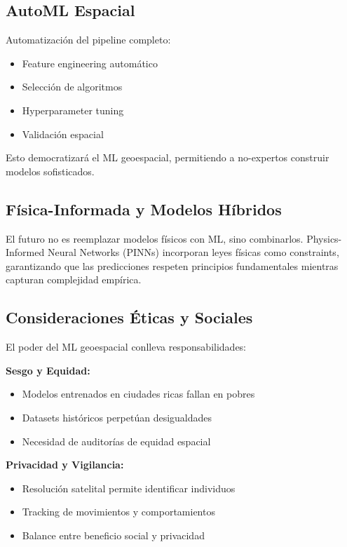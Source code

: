 \documentclass[12pt,a4paper]{article}
\begin{document}
\subsection{AutoML Espacial}

Automatización del pipeline completo:
\begin{itemize}
    \item Feature engineering automático
    \item Selección de algoritmos
    \item Hyperparameter tuning
    \item Validación espacial
\end{itemize}

Esto democratizará el ML geoespacial, permitiendo a no-expertos construir modelos sofisticados.

\subsection{Física-Informada y Modelos Híbridos}

\begin{reflexion}
El futuro no es reemplazar modelos físicos con ML, sino combinarlos. Physics-Informed Neural Networks (PINNs) incorporan leyes físicas como constraints, garantizando que las predicciones respeten principios fundamentales mientras capturan complejidad empírica.
\end{reflexion}

\subsection{Consideraciones Éticas y Sociales}

El poder del ML geoespacial conlleva responsabilidades:

\textbf{Sesgo y Equidad:}
\begin{itemize}
    \item Modelos entrenados en ciudades ricas fallan en pobres
    \item Datasets históricos perpetúan desigualdades
    \item Necesidad de auditorías de equidad espacial
\end{itemize}

\textbf{Privacidad y Vigilancia:}
\begin{itemize}
    \item Resolución satelital permite identificar individuos
    \item Tracking de movimientos y comportamientos
    \item Balance entre beneficio social y privacidad
\end{itemize}
\end{document}

